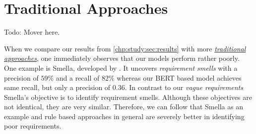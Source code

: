 \section{Traditional Approaches}
\label{chp:relation_to_existing_evidence:sec:traditional_approaches}

Todo: Mover \parencite{Femmer:2017} here.

When we compare our results from \cref{chp:study:sec:results} with more \hyperref[chp:related_research:sec:rule_based approaches]{\textit{traditional approaches}}, one immediately observes that our models perform rather poorly.
One example is Smella, developed by \textcite{Femmer:2017}.
It uncovers \textit{requirement smells} with a precision of $59\%$ and a recall of $82\%$ whereas our \ac{BERT} based model achieves same recall, but only a precision of $0.36$.
In contrast to our \textit{vague requirements} Smella's objective is to identify requirement smells.
Although these objectives are not identical, they are very similar.
Therefore, we can follow that Smella as an example and rule based approaches in general are severely better in identifying poor requirements.
